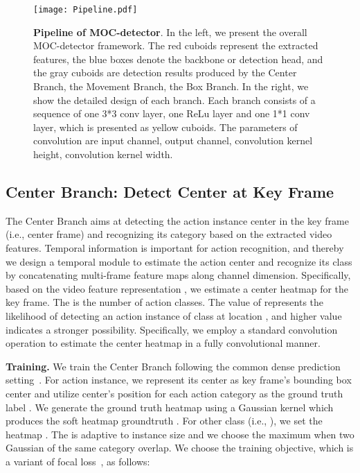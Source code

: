 \documentclass[runningheads]{llncs}
\begin{document}
\begin{figure}[t]
  \centering
    \texttt{[image: Pipeline.pdf]}
    \caption{{\bf Pipeline of MOC-detector}.
    In the left, we present the overall MOC-detector framework. The red cuboids represent the extracted features, the blue boxes denote the backbone or detection head, and the gray cuboids are detection results produced by the Center Branch, the Movement Branch, the Box Branch.
    In the right, we show the detailed design of each branch. Each branch consists of a sequence of one 3*3 conv layer, one ReLu layer and one 1*1 conv layer, which is presented as yellow cuboids. The parameters of convolution are input channel, output channel, convolution kernel height, convolution kernel width.
    }
    \label{fig:pipeline}
  \end{figure}

\subsection{Center Branch: Detect Center at Key Frame}\label{CenterBranch}
The Center Branch aims at detecting the action instance center in the key frame (i.e., center frame) and recognizing its category based on the extracted video features. Temporal information is important for action recognition, and thereby we design a temporal module to estimate the action center and recognize its class by concatenating multi-frame feature maps along channel dimension. Specifically, based on the video feature representation , we estimate a center heatmap  for the key frame. The  is the number of action classes. The value of  represents the likelihood of detecting an action instance of class  at location , and higher value indicates a stronger possibility. Specifically, we employ a standard convolution operation to estimate the center heatmap in a fully convolutional manner.

\textbf{Training.} We train the Center Branch following the common dense prediction setting~\cite{CornerNet,CenterNet}. For  action instance, we represent its center as key frame's bounding box center and utilize center's position for each action category as the ground truth label . We generate the ground truth heatmap  using a
 Gaussian kernel which produces the soft heatmap groundtruth . For other class (i.e., ), we set the heatmap .
The  is adaptive to instance size and we choose the maximum when two Gaussian of the same category overlap. We choose the training objective, which is a variant of focal loss~\cite{lin2017focal}, as follows:
\end{document}
